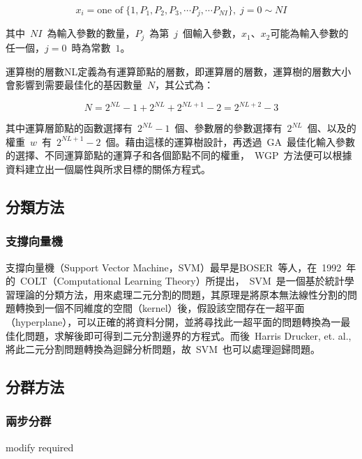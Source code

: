 \begin{equation} x_i = \text{one of}\; \{1, P_1, P_2, P_3, \cdots P_j, \cdots P_{NI}\},\; j = 0 \sim NI \label{eq:WGP-xi}\end{equation}

其中~$NI$~為輸入參數的數量，$P_j$~為第~$j$~個輸入參數，$x_1$、$x_2$可能為輸入參數的任一個，$j = 0$~時為常數~$1$。

運算樹的層數NL定義為有運算節點的層數，即運算層的層數，運算樹的層數大小會影響到需要最佳化的基因數量~$N$，其公式為：

\begin{equation} N = 2^{NL} - 1 + 2^{NL} + 2^{NL + 1} - 2 = 2^{NL + 2} - 3  \label{eq:WGP-N}\end{equation}


其中運算層節點的函數選擇有~$2^{NL} - 1$~個、參數層的參數選擇有~$2^{NL}$~個、以及的權重~$w$~有~$2^{NL + 1} - 2$~個。藉由這樣的運算樹設計，再透過~GA~最佳化輸入參數的選擇、不同運算節點的運算子和各個節點不同的權重，~WGP~方法便可以根據資料建立出一個屬性與所求目標的關係方程式。

\subsection{分類方法}

\subsubsection{支撐向量機}

支撐向量機（Support Vector Machine，SVM）最早是BOSER~\cite{boser1992}等人，在~1992~年的~COLT（Computational Learning Theory）所提出，~SVM~是一個基於統計學習理論的分類方法，用來處理二元分割的問題，其原理是將原本無法線性分割的問題轉換到一個不同維度的空間（kernel）後，假設該空間存在一超平面（hyperplane），可以正確的將資料分開，並將尋找此一超平面的問題轉換為一最佳化問題，求解後即可得到二元分割邊界的方程式。而後~Harris Drucker, et. al.,\cite{drucker1997support} 將此二元分割問題轉換為迴歸分析問題，故~SVM~也可以處理迴歸問題。

\subsection{分群方法}

\subsubsection{兩步分群}

modify required

